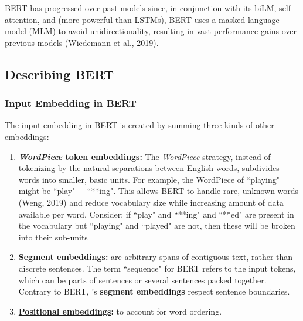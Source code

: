 BERT has progressed over past models since, in conjunction with its \hyperref[sec:BidirectionalLM]{biLM}, \hyperref[sec:SelfAttention]{self attention}, and  (more powerful than \hyperref[sec:LSTM]{LSTM}s), BERT uses a \hyperref[sec:maskedlanguagemodelMLM]{masked language model (MLM)} to avoid unidirectionality, resulting in vast performance gains over previous models (Wiedemann et al., 2019). 




\subsection{Describing BERT} \label{sec:DescribingBERT}

\subsubsection{Input Embedding in BERT} \label{sec:BERTInputEmbedding}

The input embedding in BERT is created by summing three kinds of other embeddings: 

\begin{enumerate}
    \item \textbf{\textit{WordPiece} token embeddings: }The \emph{WordPiece}  strategy, instead of tokenizing by the natural separations between English words, subdivides words into smaller, basic units. For example, the WordPiece  of ``playing" might be ``play" + ``**ing". This allows BERT to handle rare, unknown words (Weng, 2019) and reduce vocabulary size while increasing amount of data available per word. Consider: if ``play" and ``**ing" and ``**ed" are present in the vocabulary but ``playing" and ``played" are not, then these will be broken into their sub-units
    
    \item \textbf{Segment embeddings: }are  arbitrary spans of contiguous text, rather than discrete sentences. The term ``sequence" for BERT refers to the input tokens, which can be parts of sentences or several sentences packed together. Contrary to BERT,  's \textbf{segment embeddings} respect sentence boundaries. 
    
    \item \textbf{\hyperref[sec:PosEncodings]{Positional embeddings}: } to account for word ordering. 
\end{enumerate}


